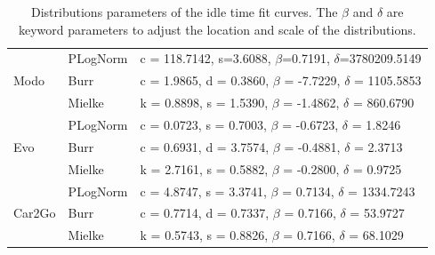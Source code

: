 \begin{table}
\centering
\scriptsize
\begin{tabular}{lll}
\hline
\multirow{3}{*}{Modo}   & PLogNorm       & c = 118.7142, s=3.6088,  $\beta$=0.7191,  $\delta$=3780209.5149                     \\
                        & Burr                & c = 1.9865, d = 0.3860,  $\beta$ = -7.7229, $\delta$ = 1105.5853 \\
                        & Mielke & k = 0.8898, s = 1.5390,  $\beta$ = -1.4862, $\delta$ = 860.6790 \\ \hline
\multirow{3}{*}{Evo}    & PLogNorm       & c = 0.0723, s = 0.7003,  $\beta$ = -0.6723,  $\delta$ = 1.8246                          \\
                        & Burr                & c = 0.6931, d = 3.7574, $\beta$ = -0.4881, $\delta$ = 2.3713   \\
                        & Mielke & k = 2.7161, s = 0.5882, $\beta$ = -0.2800, $\delta$ = 0.9725 \\ \hline
\multirow{3}{*}{Car2Go} & PLogNorm       & c = 4.8747, s = 3.3741,  $\beta$ = 0.7134,  $\delta$ = 1334.7243                           \\
                        & Burr                & c = 0.7714, d = 0.7337, $\beta$ = 0.7166, $\delta$ = 53.9727   \\
                        & Mielke & k = 0.5743, s = 0.8826, $\beta$ = 0.7166, $\delta$ = 68.1029   \\ \hline
\end{tabular}
\caption{Distributions parameters of the idle time fit curves. The $\beta$ and $\delta$ are keyword parameters to adjust the location and scale of the distributions.}
\label{table:fit_idle}
\end{table}

